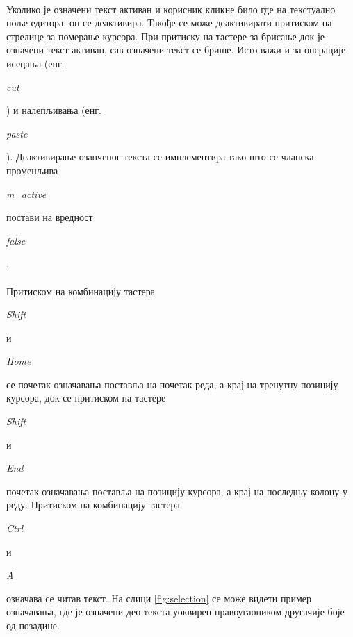 \documentclass[12pt,oneside]{memoir}
\begin{document}
\paragraph{}
Уколико је означени текст активан и корисник кликне било где на текстуално поље едитора,
он се деактивира. Такође се може деактивирати притиском на стрелице за померање
курсора. При притиску на тастере за брисање док је означени текст активан, сав означени
текст се брише. Исто важи и за операције исецања
(енг. \begin{latinica}\textit{cut}\end{latinica}) и налепљивања
(енг. \begin{latinica}\textit{paste}\end{latinica}). Деактивирање озанченог текста
се имплементира тако што се чланска променљива 
\begin{latinica}\textit{m\_active}\end{latinica} постави на вредност
\begin{latinica}\textit{false}\end{latinica}.

\paragraph{}
Притиском на комбинацију тастера \begin{latinica}\textit{Shift}\end{latinica} и
\begin{latinica}\textit{Home}\end{latinica} се почетак означавања поставља на почетак реда,
а крај на тренутну позицију курсора, док се притиском на тастере 
\begin{latinica}\textit{Shift}\end{latinica} и \begin{latinica}\textit{End}\end{latinica}
почетак означавања поставља на позицију курсора, а крај на последњу колону у реду.
Притиском на комбинацију тастера \begin{latinica}\textit{Ctrl}\end{latinica} и
\begin{latinica}\textit{A}\end{latinica} означава се читав текст. На слици 
\ref{fig:selection} се може видети пример означавања, где је означени део текста
уоквирен правоугаоником другачије боје од позадине.
\end{document}
